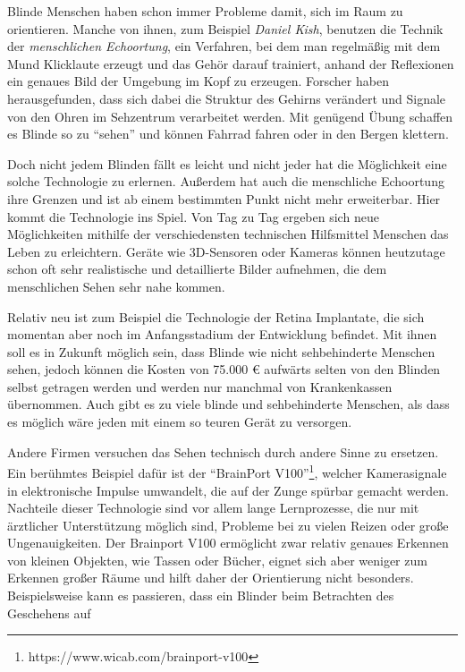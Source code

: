 \documentclass[a4paper,12pt,ngerman]{scrartcl}
\begin{document}
Blinde Menschen haben schon immer Probleme damit, sich im Raum zu orientieren.
Manche von ihnen, zum Beispiel \textit{Daniel Kish}, benutzen die Technik der 
\textit{menschlichen Echoortung}, ein Verfahren, bei dem
man regelmäßig mit dem Mund Klicklaute erzeugt und das Gehör darauf trainiert,
anhand der Reflexionen ein genaues Bild der Umgebung im Kopf zu erzeugen.
Forscher haben herausgefunden, dass sich dabei die Struktur des Gehirns verändert 
und Signale von den Ohren im Sehzentrum verarbeitet werden.
Mit genügend Übung schaffen es Blinde so zu \enquote{sehen} und können Fahrrad 
fahren oder in den Bergen klettern. \par 
Doch nicht jedem Blinden fällt es leicht und nicht jeder hat die Möglichkeit eine
solche Technologie zu erlernen. Außerdem hat auch die menschliche Echoortung ihre
Grenzen und ist ab einem bestimmten Punkt nicht mehr erweiterbar. Hier kommt die 
Technologie ins Spiel. Von Tag zu Tag ergeben sich neue Möglichkeiten mithilfe 
der verschiedensten technischen Hilfsmittel Menschen das Leben zu erleichtern.
Geräte wie 3D-Sensoren oder Kameras können heutzutage schon oft sehr realistische
und detaillierte Bilder aufnehmen, die dem menschlichen Sehen sehr nahe kommen. \par 
Relativ neu ist zum Beispiel die Technologie der Retina Implantate, die sich 
momentan aber noch im Anfangsstadium der Entwicklung befindet. Mit ihnen soll es in 
Zukunft möglich sein, dass Blinde wie nicht sehbehinderte Menschen sehen, jedoch
können die Kosten von 75.000 \euro{} aufwärts selten von den Blinden selbst getragen
werden und werden nur manchmal von Krankenkassen übernommen. Auch gibt es zu viele
blinde und sehbehinderte Menschen, als dass es möglich wäre jeden mit einem so 
teuren Gerät zu versorgen.\par 
Andere Firmen versuchen das Sehen technisch durch andere Sinne zu ersetzen.
Ein berühmtes Beispiel dafür ist der 
\enquote{BrainPort V100}\footnote{https://www.wicab.com/brainport-v100}, welcher 
Kamerasignale in elektronische Impulse umwandelt, die auf der Zunge spürbar
gemacht werden. Nachteile dieser
Technologie sind vor allem lange Lernprozesse, die nur mit ärztlicher Unterstützung
möglich sind, Probleme bei zu vielen Reizen oder große Ungenauigkeiten. Der Brainport V100 ermöglicht
zwar relativ genaues Erkennen von kleinen Objekten, wie Tassen oder Bücher, eignet sich aber weniger zum
Erkennen großer Räume und hilft daher der Orientierung nicht besonders.
Beispielsweise kann es passieren, dass ein Blinder beim Betrachten des Geschehens auf 
\end{document}
